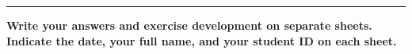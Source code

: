 \documentclass[a4paper,10pt]{article}
\begin{document}
\vfill
\rule{\linewidth}{0.6pt}
\vspace{0.3em}

\begin{center}
    \textbf{Write your answers and exercise development on separate sheets.}\\
    \textbf{Indicate the date, your full name, and your student ID on each sheet.}
\end{center}
\end{document}

